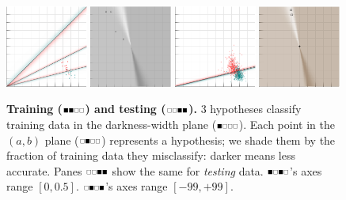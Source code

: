 \documentclass[11pt, justified]{tufte-book}
\newcommand{\offourline}[1]{
    {\tiny \raisebox{0.04cm}{\scalebox{0.9}{$\substack{
        \IfSubStr{#1}{0}{{\blacksquare}}{\square}   
        \IfSubStr{#1}{1}{{\blacksquare}}{\square}
        \IfSubStr{#1}{2}{{\blacksquare}}{\square}   
        \IfSubStr{#1}{3}{{\blacksquare}}{\square}   
    }$}}}%
}
\theoremstyle{definition}
\begin{document}
        \begin{figure}[h]
            \includegraphics[width=0.24\textwidth]{example-mnist/train.png}%
            \hspace{0.005\textwidth}%
            \includegraphics[width=0.24\textwidth]{example-mnist/train-scat.png}%
            \hspace{0.02\textwidth}%
            \includegraphics[width=0.24\textwidth]{example-mnist/test.png}%
            \hspace{0.005\textwidth}%
            \includegraphics[width=0.24\textwidth]{example-mnist/test-scat.png}
            \caption{
              \textbf{Training
              ($\protect\offourline{01}$) and testing
              ($\protect\offourline{23}$).}
              $3$ hypotheses classify
              training data in the darkness-width plane ($\protect\offourline{0}$).
              Each point in the $(a,b)$ plane ($\protect\offourline{1}$) represents
              a hypothesis; we shade them by the fraction of training
              data they misclassify: darker means less accurate.
              Panes $\protect\offourline{23}$ show the same for
              \emph{testing} data.
              $\protect\offourline{02}$'s axes range $[0, 0.5]$.
              $\protect\offourline{13}$'s axes range $[-99,+99]$. 
            }
        \end{figure}
\end{document}
